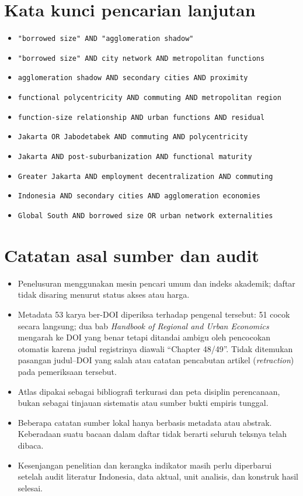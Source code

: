 \documentclass[
  indonesian,
  11pt,
  a4paper,
  oneside,
  openany]{report}
\providecommand{\tightlist}{%
  \setlength{\itemsep}{0pt}\setlength{\parskip}{0pt}}
\begin{document}
\section{Kata kunci pencarian
lanjutan}\label{kata-kunci-pencarian-lanjutan}

\begin{itemize}
\tightlist
\item
  \texttt{"borrowed\ size"\ AND\ "agglomeration\ shadow"}
\item
  \texttt{"borrowed\ size"\ AND\ city\ network\ AND\ metropolitan\ functions}
\item
  \texttt{agglomeration\ shadow\ AND\ secondary\ cities\ AND\ proximity}
\item
  \texttt{functional\ polycentricity\ AND\ commuting\ AND\ metropolitan\ region}
\item
  \texttt{function-size\ relationship\ AND\ urban\ functions\ AND\ residual}
\item
  \texttt{Jakarta\ OR\ Jabodetabek\ AND\ commuting\ AND\ polycentricity}
\item
  \texttt{Jakarta\ AND\ post-suburbanization\ AND\ functional\ maturity}
\item
  \texttt{Greater\ Jakarta\ AND\ employment\ decentralization\ AND\ commuting}
\item
  \texttt{Indonesia\ AND\ secondary\ cities\ AND\ agglomeration\ economies}
\item
  \texttt{Global\ South\ AND\ borrowed\ size\ OR\ urban\ network\ externalities}
\end{itemize}

\section{Catatan asal sumber dan
audit}\label{catatan-asal-sumber-dan-audit}

\begin{itemize}
\tightlist
\item
  Penelusuran menggunakan mesin pencari umum dan indeks akademik; daftar
  tidak disaring menurut status akses atau harga.
\item
  Metadata 53 karya ber-DOI diperiksa terhadap pengenal tersebut: 51
  cocok secara langsung; dua bab \emph{Handbook of Regional and Urban
  Economics} mengarah ke DOI yang benar tetapi ditandai ambigu oleh
  pencocokan otomatis karena judul registrinya diawali ``Chapter
  48/49''. Tidak ditemukan pasangan judul--DOI yang salah atau catatan
  pencabutan artikel (\emph{retraction}) pada pemeriksaan tersebut.
\item
  Atlas dipakai sebagai bibliografi terkurasi dan peta disiplin
  perencanaan, bukan sebagai tinjauan sistematis atau sumber bukti
  empiris tunggal.
\item
  Beberapa catatan sumber lokal hanya berbasis metadata atau abstrak.
  Keberadaan suatu bacaan dalam daftar tidak berarti seluruh teksnya
  telah dibaca.
\item
  Kesenjangan penelitian dan kerangka indikator masih perlu diperbarui
  setelah audit literatur Indonesia, data aktual, unit analisis, dan
  konstruk hasil selesai.
\end{itemize}
\end{document}
